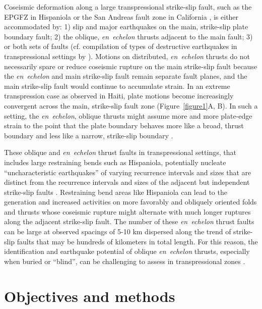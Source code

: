 \documentclass[linenumbers,draft]{agujournal}
\begin{document}
Coseismic deformation along a large transpressional strike-slip fault, such as the EPGFZ \citep{calais2002strain} in Hispaniola or the San Andreas fault zone in California \citep{segall1990surface}, is either accommodated by: 1) slip and major earthquakes on the main, strike-slip plate boundary fault; 2) the oblique, \textit{en~echelon} thrusts adjacent to the main fault; 3) or both sets of faults (cf. compilation of types of destructive earthquakes in transpressional settings by \citet{hayes2010complex}). Motions on distributed, \textit{en~echelon} thrusts do not necessarily spare or reduce coseismic rupture on the main strike-slip fault because the \textit{en~echelon} and main strike-slip fault remain separate fault planes, and the main strike-slip fault would continue to accumulate strain. In an extreme transpression case as observed in Haiti, plate motions become increasingly convergent across the main, strike-slip fault zone (Figure~\ref{figure1}A, B). In such a setting, the \textit{en~echelon}, oblique thrusts might assume more and more plate-edge strain to the point that the plate boundary behaves more like a broad, thrust boundary and less like a narrow, strike-slip boundary \citep{mount1987state}.

These oblique and \textit{en~echelon} thrust faults in transpressional settings, that includes large restraining bends such as Hispaniola, potentially nucleate ``uncharacteristic earthquakes'' of varying recurrence intervals and sizes that are distinct from the recurrence intervals and sizes of the adjacent but independent strike-slip faults \citep{Fielding2013}. Restraining bend areas like Hispaniola can lead to the generation and increased activities on more favorably and obliquely oriented folds and thrusts whose coseismic rupture might alternate with much longer ruptures along the adjacent strike-slip fault. The number of these \textit{en~echelon} thrust faults can be large at observed spacings of 5-10 km dispersed along the trend of strike-slip faults that may be hundreds of kilometers in total length. For this reason, the identification and earthquake potential of oblique \textit{en~echelon} thrusts, especially when buried or ``blind'', can be challenging to assess in transpressional zones \citep{frankel2011seismic}.

\section{Objectives and methods}
\end{document}
